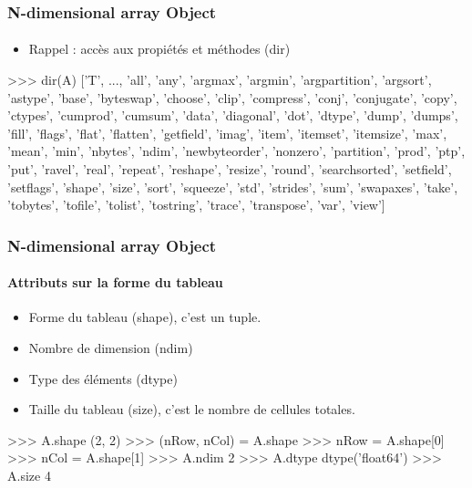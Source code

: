 \begin{frame}[fragile]
\frametitle{N-dimensional array Object}
\framesubtitle{}
\begin{itemize}
 \item Rappel : accès aux propiétés et méthodes (dir) 
\end{itemize}
\begin{pythonConsole}

>>> dir(A)
['T', ..., 'all', 'any', 'argmax', 'argmin', 'argpartition', 'argsort', 
'astype', 'base', 'byteswap', 'choose', 'clip', 'compress', 'conj', 'conjugate',
'copy', 'ctypes', 'cumprod', 'cumsum', 'data', 'diagonal', 'dot', 'dtype',
'dump', 'dumps', 'fill', 'flags', 'flat', 'flatten', 'getfield', 'imag', 'item',
'itemset', 'itemsize', 'max', 'mean', 'min', 'nbytes', 'ndim', 'newbyteorder',
'nonzero', 'partition', 'prod', 'ptp', 'put', 'ravel', 'real', 'repeat',
'reshape', 'resize', 'round', 'searchsorted', 'setfield', 'setflags', 'shape',
'size', 'sort', 'squeeze', 'std', 'strides', 'sum', 'swapaxes', 'take',
'tobytes', 'tofile', 'tolist', 'tostring', 'trace', 'transpose', 'var', 'view']
\end{pythonConsole}
\end{frame}
\begin{frame}[fragile]
\frametitle{N-dimensional array Object}
\framesubtitle{Attributs sur la forme du tableau}
\begin{itemize}
 \item Forme du tableau (shape), c'est un tuple.  
 \item Nombre de dimension (ndim)
 \item Type des éléments (dtype)
 \item Taille du tableau (size), c'est le nombre de cellules totales. 
\end{itemize}
\begin{pythonConsole}
>>> A.shape
(2, 2)
>>> (nRow, nCol) = A.shape
>>> nRow = A.shape[0]
>>> nCol = A.shape[1]
>>> A.ndim
2
>>> A.dtype
dtype('float64')
>>> A.size
4
\end{pythonConsole}
\end{frame}
